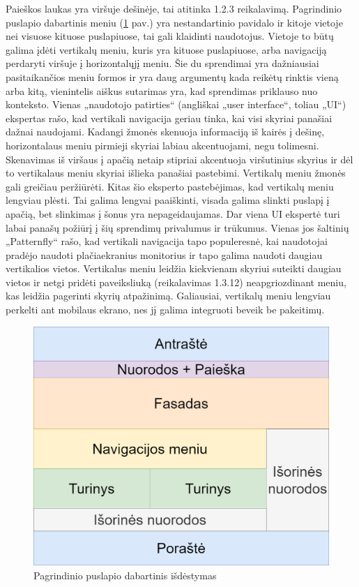\documentclass{VUMIFPSbakalaurinis}
\begin{document}
Paieškos laukas yra viršuje dešinėje, tai atitinka 1.2.3 reikalavimą. Pagrindinio puslapio dabartinis meniu (\ref{img:PuslapioArchPagrindinisDabartinis} pav.) yra nestandartinio pavidalo ir kitoje vietoje nei visuose kituose puslapiuose, tai gali klaidinti naudotojus. Vietoje to būtų galima įdėti vertikalų meniu, kuris yra kituose puslapiuose, arba navigaciją perdaryti viršuje į horizontalųjį meniu. Šie du sprendimai yra dažniausiai pasitaikančios meniu formos ir yra daug argumentų kada reikėtų rinktis vieną arba kitą, vienintelis aiškus sutarimas yra, kad sprendimas priklauso nuo konteksto. Vienas „naudotojo patirties“ (angliškai „user interface“, toliau „UI“) ekspertas rašo, kad vertikali navigacija geriau tinka, kai visi skyriai panašiai dažnai naudojami\cite{TopVsLeftNav}. Kadangi žmonės skenuoja informaciją iš kairės į dešinę, horizontalaus meniu pirmieji skyriai labiau akcentuojami, negu tolimesni. Skenavimas iš viršaus į apačią netaip stipriai akcentuoja viršutinius skyrius ir dėl to vertikalaus meniu skyriai išlieka panašiai pastebimi. Vertikalų meniu žmonės gali greičiau peržiūrėti\cite{TopVsLeftNav}. Kitas šio eksperto pastebėjimas, kad vertikalų meniu lengviau plėsti\cite{TopVsLeftNav}. Tai galima lengvai paaiškinti, visada galima slinkti puslapį į apačią, bet slinkimas į šonus yra nepageidaujamas. Dar viena UI ekspertė turi labai panašų požiūrį į šių sprendimų privalumus ir trūkumus\cite{TopVsLeftNav2}. Vienas jos šaltinių „Patternfly“ rašo, kad vertikali navigacija tapo populeresnė, kai naudotojai pradėjo naudoti plačiaekranius monitorius ir tapo galima naudoti daugiau vertikalios vietos\cite{LeftNav}. Vertikalus meniu leidžia kiekvienam skyriui suteikti daugiau vietos ir netgi pridėti paveiksliuką (reikalavimas 1.3.12) neapgriozdinant meniu, kas leidžia pagerinti skyrių atpažinimą. Galiausiai, vertikalų meniu lengviau perkelti ant mobilaus ekrano, nes jį galima integruoti beveik be pakeitimų.

\pagebreak
\begin{figure}[htb]
    \centering
    \includegraphics[scale=0.25]{img/PuslapioArchPagrindinisDabartinis}
    \caption{Pagrindinio puslapio dabartinis išdėstymas}
    \label{img:PuslapioArchPagrindinisDabartinis}
\end{figure}
\end{document}
